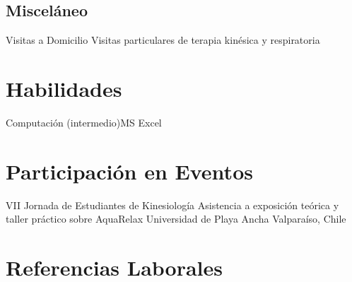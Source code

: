 \documentclass[11pt,a4paper,sans]{moderncv}
\begin{document}
        
\subsection{Misceláneo}


\cventry{}
        {Visitas a Domicilio}
        {Visitas particulares de terapia kinésica y respiratoria}
        {}
        {}
        {}
        
\section{Habilidades}
           {Computación (intermedio)}{MS Excel}

\section{Participación en Eventos}

        {VII Jornada de Estudiantes de Kinesiología}
        {Asistencia a exposición teórica y taller práctico sobre AquaRelax}
        {Universidad de Playa Ancha}
        {Valparaíso, Chile}
        {}
        
\section{Referencias Laborales}

\end{document}
